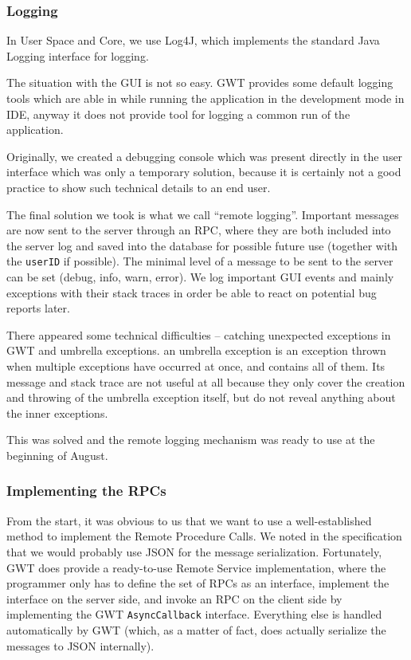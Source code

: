 \subsubsection{Logging}

In User Space and Core, we use Log4J, which implements the standard Java Logging interface for logging.

The situation with the GUI is not so easy. GWT provides some default logging tools which are able in while running the application in the development mode in IDE, anyway it does not provide tool for logging a common run of the application.

Originally, we created a debugging console which was present directly in the user interface which was only a temporary solution, because it is 
certainly not a good practice to show such technical details to an end user.

The final solution we took is what we call ``remote logging''. Important messages are now sent to the server through an RPC, where they are both included into the server log and saved into the database for possible future use (together with the {\tt userID} if possible).
The minimal level of a message to be sent to the server can be set (debug, info, warn, error). We log important GUI events and mainly exceptions with their stack traces in order be able to react on potential bug reports later.

There appeared some technical difficulties -- catching unexpected exceptions in GWT and umbrella exceptions. an umbrella exception is an exception thrown when multiple exceptions have occurred at once, and contains all of them. Its message and stack trace are not useful at all because they only cover the creation and throwing of the umbrella exception itself, but do not reveal anything about the inner exceptions.

This was solved and the remote logging mechanism was ready to use at the beginning of August.

\subsubsection{Implementing the RPCs}

From the start, it was obvious to us that we want to use a well-established method to implement the Remote Procedure Calls.
We noted in the specification that we would probably use JSON for the message serialization.
Fortunately, GWT does provide a ready-to-use Remote Service implementation, where the programmer only has to define the set of RPCs as an interface, implement the interface on the server side, and invoke an RPC on the client side by implementing the GWT {\tt AsyncCallback} interface.
Everything else is handled automatically by GWT (which, as a matter of fact, does actually serialize the messages to JSON internally).

